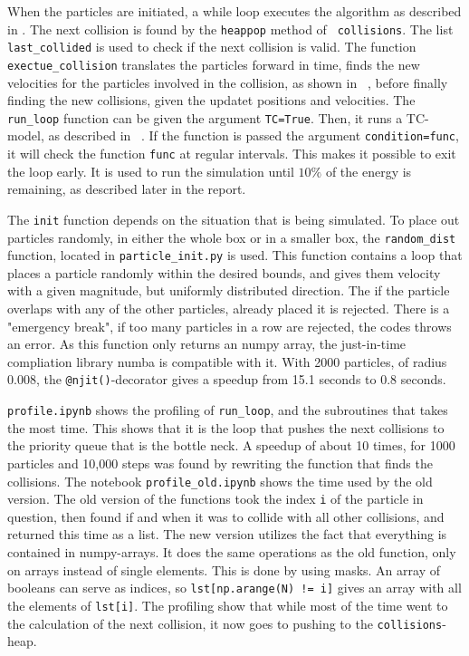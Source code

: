 \documentclass{article}
\begin{document}
    When the particles are initiated, a while loop executes the algorithm as described in \cite{exercise}. The next collision is found by the \verb|heappop| method of \verb| collisions|. The list \verb|last_collided| is used to check if the next collision is valid. The function \verb|exectue_collision| translates the particles forward in time, finds the new velocities for the particles involved in the collision, as shown in ~\cite{exercise}, before finally finding the new collisions, given the updatet positions and velocities. The \verb|run_loop| function can be given the argument \verb|TC=True|. Then, it runs a TC-model, as described in ~\cite{TC}. If the function is passed the argument \verb|condition=func|, it will check the function \verb|func| at regular intervals. This makes it possible to exit the loop early. It is used to run the simulation until $10\%$ of the energy is remaining, as described later in the report.

    The \verb|init| function depends on the situation that is being simulated. To place out particles randomly, in either the whole box or in a smaller box, the \verb|random_dist| function, located in \verb|particle_init.py| is used. This function contains a loop that places a particle randomly within the desired bounds, and gives them velocity with a given magnitude, but uniformly distributed direction. The if the particle overlaps with any of the other particles, already placed it is rejected. There is a "emergency break", if too many particles in a row are rejected, the codes throws an error. As this function only returns an numpy array, the just-in-time compliation library numba is compatible with it. With 2000 particles, of radius 0.008, the \verb|@njit()|-decorator gives a speedup from 15.1 seconds to 0.8 seconds.

    \verb|profile.ipynb| shows the profiling of \verb|run_loop|, and the subroutines that takes the most time. This shows that it is the loop that pushes the next collisions to the priority queue that is the bottle neck. A speedup of about 10 times, for 1000 particles and 10,000 steps was found by rewriting the function that finds the collisions. The notebook \verb|profile_old.ipynb| shows the time used by the old version. The old version of the functions took the index \verb|i| of the particle in question, then found if and when it was to collide with all other collisions, and returned this time as a list. The new version utilizes the fact that everything is contained in numpy-arrays. It does the same operations as the old function, only on arrays instead of single elements. This is done by using masks. An array of booleans can serve as indices, so \verb|lst[np.arange(N) != i]| gives an array with all the elements of \verb|lst[i]|. The profiling show that while most of the time went to the calculation of the next collision, it now goes to pushing to the \verb|collisions|-heap.
\end{document}
